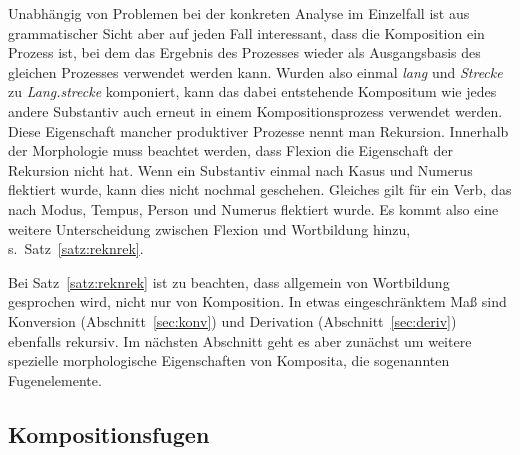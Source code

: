 Unabhängig von Problemen bei der konkreten Analyse im Einzelfall ist aus grammatischer Sicht aber auf jeden Fall interessant, dass die Komposition ein Prozess ist, bei dem das Ergebnis des Prozesses wieder als Ausgangsbasis des gleichen Prozesses verwendet werden kann.
Wurden also einmal \textit{lang} und \textit{Strecke} zu \textit{Lang.strecke} komponiert, kann das dabei entstehende Kompositum wie jedes andere Substantiv auch erneut in einem Kompositionsprozess verwendet werden.
Diese Eigenschaft mancher produktiver Prozesse nennt man Rekursion.
Innerhalb der Morphologie muss beachtet werden, dass Flexion die Eigenschaft der Rekursion nicht hat.
Wenn ein Substantiv einmal nach Kasus und Numerus flektiert wurde, kann dies nicht nochmal geschehen.
Gleiches gilt für ein Verb, das nach Modus, Tempus, Person und Numerus flektiert wurde.
Es kommt also eine weitere Unterscheidung zwischen Flexion und Wortbildung hinzu, s.\ Satz~\ref{satz:reknrek}.

\newpage


Bei Satz~\ref{satz:reknrek} ist zu beachten, dass allgemein von Wortbildung gesprochen wird, nicht nur von Komposition.
In etwas eingeschränktem Maß sind Konversion (Abschnitt~\ref{sec:konv}) und Derivation (Abschnitt~\ref{sec:deriv}) ebenfalls rekursiv.
Im nächsten Abschnitt geht es aber zunächst um weitere spezielle morphologische Eigenschaften von Komposita, die sogenannten Fugenelemente.

\subsection{Kompositionsfugen}


